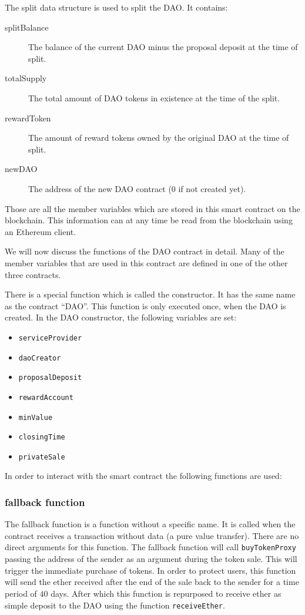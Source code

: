 \documentclass[9pt,oneside]{amsart}
\begin{document}
\begin{multicols}{2}
The split data structure is used to split the DAO. It contains:
\begin{description}
 \item[splitBalance] The balance of the current DAO minus the proposal deposit at the time of split.
 \item[totalSupply] The total amount of DAO tokens in existence at the time of the split.
 \item[rewardToken] The amount of reward tokens owned by the original DAO at the time of split.
 \item[newDAO] The address of the new DAO contract ($0$ if not created yet).
\end{description}

Those are all the member variables which are stored in this smart contract on the blockchain. This information can at any time be read from the blockchain using an Ethereum client.

We will now discuss the functions of the DAO contract in detail. Many of the member variables that are used in this contract are defined in one of the other three contracts. 

There is a special function which is called the constructor. It has the same name as the contract ``DAO''. This function is only executed once, when the DAO is created.
In the DAO constructor, the following variables are set:
\begin{itemize}
 \item \verb|serviceProvider|
 \item \verb|daoCreator|
 \item \verb|proposalDeposit|
 \item \verb|rewardAccount| 
 \item \verb|minValue|
 \item \verb|closingTime|
 \item \verb|privateSale|
\end{itemize}

In order to interact with the smart contract the following functions are used:

\subsubsection*{fallback function}
The fallback function is a function without a specific name. It is called when the contract receives a transaction without data (a pure value transfer). There are no direct arguments for this function.
The fallback function will call \verb|buyTokenProxy| passing the address of the sender as an argument during the token sale. This will trigger the immediate purchase of tokens. In order to protect users, this function will send the ether received after the end of the sale back to the sender for a time period of $40$ days. After which this function is repurposed to receive ether as simple deposit to the DAO using the function \verb|receiveEther|.


\end{multicols}
\end{document}
